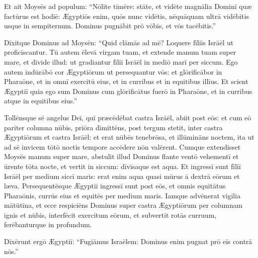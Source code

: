 Et ait Moysēs ad
populum: ``Nōlīte timēre: stāte, et vidēte magnālia Dominī
quæ factūrus est hodiē: Ægyptiōs enim, quōs nunc vidētis,
nēquāquam ultrā vidēbitis usque in
sempiternum. Dominus pugnābit prō vōbīs, et
vōs tacēbitis.''

Dīxitque Dominus ad Moysēn: ``Quid clāmās ad mē? Loquere
fīliīs Isrāēl ut proficīscantur. Tū autem ēlevā virgam tuam, et extende manum tuam super mare, et dīvide illud:
ut gradiantur fīliī Isrāēl in mediō marī per siccum. Ego autem
indūrābō cor Ægyptiōrum ut persequantur vōs: et glōrificābor in Pharaōne,
et in omnī exercitū eius, et in curribus et in equitibus illīus. Et
scient Ægyptiī quia ego sum Dominus cum glōrificātus fuerō
in Pharaōne, et in curribus atque in equitibus eius.''

Tollēnsque sē
angelus 
Deī, quī præcēdēbat castra Isrāēl, abiit post eōs:
et cum eō pariter columna nūbis, priōra dīmittēns,
post tergum stetit, inter castra Ægyptiōrum et castra Isrāēl: et erat
nūbēs tenebrōsa, et illūmināns noctem, ita
ut ad sē invicem tōtō noctis tempore accēdere nōn valērent.
Cumque extendisset Moysēs manum super mare, abstulit illud Dominus
flante ventō vehementī et ūrente
tōta nocte, et vertit in siccum: dīvīsaque est aqua. Et
ingressī sunt fīliī Isrāēl per medium siccī maris:
erat enim aqua quasi mūrus ā dextrā eōrum et læva. Persequentēsque
Ægyptiī ingressī sunt post eōs, et omnis equitātus Pharaōnis, currūs eius
et equitēs per medium maris. Iamque advēnerat vigilia
mātūtīna, et ecce respiciēns Dominus super castra Ægyptiōrum per columnam ignis et
nūbis, interfēcit exercitum eōrum, et subvertit
rotās curruum, ferēbanturque in profundum.

Dīxērunt ergō Ægyptiī: ``Fugiāmus Israēlem: Dominus enim
pugnat prō eīs contrā nōs.''

